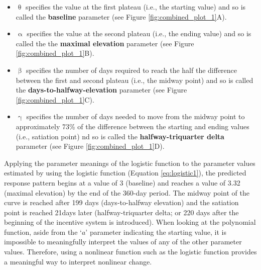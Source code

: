 \documentclass[
  english,
  man,floatsintext]{apa7}
\providecommand{\tightlist}{%
  \setlength{\itemsep}{0pt}\setlength{\parskip}{0pt}}
\begin{document}
\begin{itemize}
\tightlist
\item
  \(\uptheta\) specifies the value at the first plateau (i.e., the starting value) and so is called the \textbf{baseline} parameter (see Figure \ref{fig:combined_plot_1}A).
\item
  \(\upalpha\) specifies the value at the second plateau (i.e., the ending value) and so is called the the \textbf{maximal elevation} parameter (see Figure \ref{fig:combined_plot_1}B).
\item
  \(\upbeta\) specifies the number of days required to reach the half the difference between the first and second plateau (i.e., the midway point) and so is called the \textbf{days-to-halfway-elevation} parameter (see Figure \ref{fig:combined_plot_1}C).
\item
  \(\upgamma\) specifies the number of days needed to move from the midway point to approximately 73\% of the difference between the starting and ending values (i.e., satiation point) nd so is called the \textbf{halfway-triquarter delta} parameter (see Figure \ref{fig:combined_plot_1}D).
\end{itemize}

\noindent Applying the parameter meanings of the logistic function to the parameter values estimated by using the logistic function (Equation \ref{eq:logistic1}), the predicted response pattern begins at a value of 3 (baseline) and reaches a value of 3.32 (maximal elevation) by the end of the 360-day period. The midway point of the curve is reached after 199 days (days-to-halfway elevation) and the satiation point is reached 21days later (halfway-triquarter delta; or 220 days after the beginning of the incentive system is introduced). When looking at the polynomial function, aside from the `\(a\)' parameter indicating the starting value, it is impossible to meaningfully interpret the values of any of the other parameter values. Therefore, using a nonlinear function such as the logistic function provides a meaningful way to interpret nonlinear change.
\end{document}
